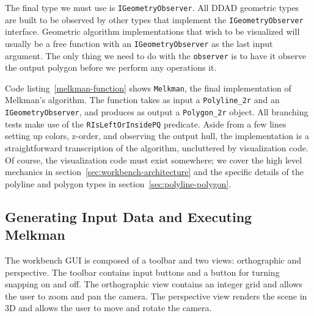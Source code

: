 The final type we must use is \texttt{IGeometryObserver}. All DDAD geometric
types are built to be observed by other types that implement the
\texttt{IGeometryObserver} interface. Geometric algorithm implementations that
wish to be visualized will usually be a free function with an
\texttt{IGeometryObserver} as the last input argument. The only thing we need to
do with the \texttt{observer} is to have it observe the output polygon before we
perform any operations it.

Code listing~\ref{melkman-function} shows \texttt{Melkman}, the final 
implementation of Melkman's algorithm. The function takes as input a 
\texttt{Polyline\_2r} and an \texttt{IGeometryObserver}, and produces as output
a \texttt{Polygon\_2r} object. All branching tests make use of the
\texttt{RIsLeftOrInsidePQ} predicate. Aside from a few lines setting up colors,
z-order, and observing the output hull, the implementation is a straightforward
transcription of the algorithm, uncluttered by visualization code. Of course,
the visualization code must exist somewhere; we cover the high level mechanics
in section~\ref{sec:workbench-architecture} and the specific details of the
polyline and polygon types in section~\ref{sec:polyline-polygon}.
 


% 





% 

% 
  


\subsection{Generating Input Data and Executing Melkman} 

The workbench GUI is composed of a toolbar and two views: orthographic and
perspective. The toolbar contains input buttons and a button for turning
snapping on and off. The orthographic view contains an integer grid and allows
the user to zoom and pan the camera. The perspective view renders the scene in
3D and allows the user to move and rotate the camera.

